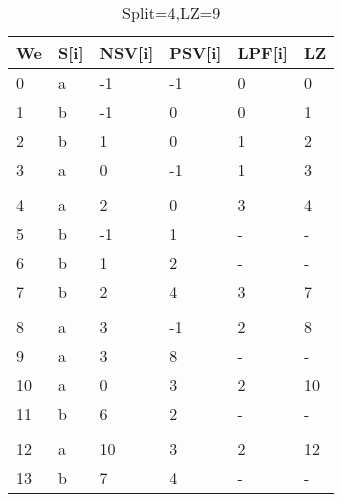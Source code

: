 \begin{table}[h]
\centering
\begin{tabular}{@{}llllll@{}}
\toprule
We  & S{[}i{]} & NSV{[}i{]} & PSV{[}i{]} & LPF{[}i{]} & LZ \\ \midrule
0  & a        & -1         & -1         & 0          & 0  \\
1  & b        & -1         & 0          & 0          & 1  \\
2  & b        & 1          & 0          & 1          & 2  \\
3  & a        & 0          & -1         & 1          & 3  \\
   &          &            &            &            &    \\
4  & a        & 2          & 0          & 3          & 4  \\
5  & b        & -1         & 1          & -          & -  \\
6  & b        & 1          & 2          & -          & -  \\
7  & b        & 2          & 4          & 3          & 7  \\
   &          &            &            &            &    \\
8  & a        & 3          & -1         & 2          & 8  \\
9  & a        & 3          & 8          & -          & -  \\
10 & a        & 0          & 3          & 2          & 10 \\
11 & b        & 6          & 2          & -          & -  \\
   &          &            &            &            &    \\
12 & a        & 10         & 3          & 2          & 12 \\
13 & b        & 7          & 4          & -          & -  \\ \bottomrule
\end{tabular}
\caption{Split=4,LZ=9}
\label{table:example4}
\end{table}

